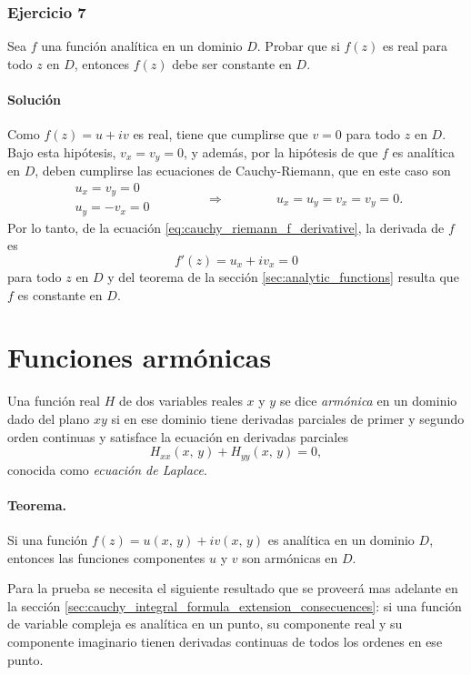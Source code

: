 \documentclass[a4paper]{report}
\begin{document}
\subsubsection{Ejercicio 7}

Sea \(f\) una función analítica en un dominio \(D\). Probar que si \(f(z)\) es real para todo \(z\) en \(D\), entonces \(f(z)\) debe ser constante en \(D\).

\paragraph{Solución} Como \(f(z)=u+iv\) es real, tiene que cumplirse que \(v=0\) para todo \(z\) en \(D\). Bajo esta hipótesis, \(v_x=v_y=0\), y además, por la hipótesis de que \(f\) es analítica en \(D\), deben cumplirse las ecuaciones de Cauchy-Riemann, que en este caso son
\[
 \begin{array}{l}
  u_x=v_y=0\\
  u_y=-v_x=0
 \end{array}
 \qquad\qquad\Rightarrow\qquad\qquad
 u_x=u_y=v_x=v_y=0.
\]
Por lo tanto, de la ecuación \ref{eq:cauchy_riemann_f_derivative}, la derivada de \(f\) es
\[
 f'(z)=u_x+iv_x=0
\]
para todo \(z\) en \(D\) y del teorema de la sección \ref{sec:analytic_functions} resulta que \(f\) es constante en \(D\).

\section{Funciones armónicas}\label{sec:harmonic_functions}

Una función real \(H\) de dos variables reales \(x\) y \(y\) se dice \emph{armónica} en un dominio dado del plano \(xy\) si en ese dominio tiene derivadas parciales de primer y segundo orden continuas y satisface la ecuación en derivadas parciales
\begin{equation}\label{eq:laplace_equation}
 H_{xx}(x,\,y)+H_{yy}(x,\,y)=0, 
\end{equation}
conocida como \emph{ecuación de Laplace}.

\paragraph{Teorema.} Si una función \(f(z)=u(x,\,y)+iv(x,\,y)\) es analítica en un dominio \(D\), entonces las funciones componentes \(u\) y \(v\) son armónicas en \(D\). 

Para la prueba se necesita el siguiente resultado que se proveerá mas adelante en la sección \ref{sec:cauchy_integral_formula_extension_consecuences}: si una función de variable compleja es analítica en un punto, su componente real y su componente imaginario tienen derivadas continuas de todos los ordenes en ese punto. 
\end{document}
